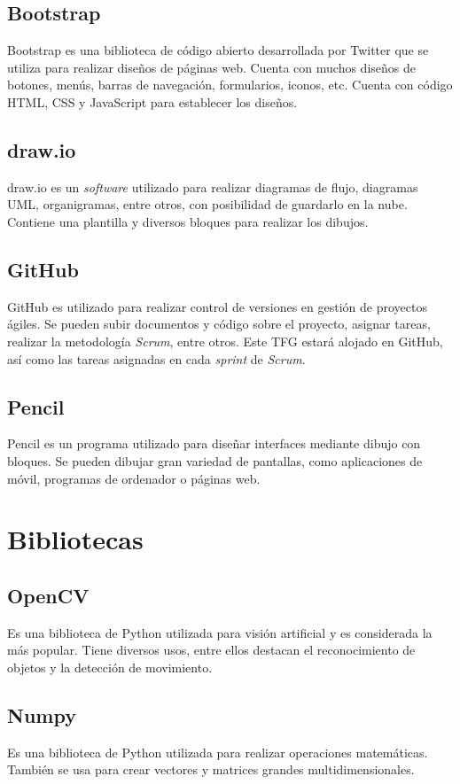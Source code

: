 \subsection{Bootstrap}
Bootstrap es una biblioteca de código abierto desarrollada por Twitter que se utiliza para realizar diseños de páginas web. Cuenta con muchos diseños de botones, menús, barras de navegación, formularios, iconos, etc. Cuenta con código HTML, CSS y JavaScript para establecer los diseños.

\subsection{draw.io}
draw.io es un \textit{software} utilizado para realizar diagramas de flujo, diagramas UML, organigramas, entre otros, con posibilidad de guardarlo en la nube. Contiene una plantilla y diversos bloques para realizar los dibujos.

\subsection{GitHub}
GitHub es utilizado para realizar control de versiones en gestión de proyectos ágiles. Se pueden subir documentos y código sobre el proyecto, asignar tareas, realizar la metodología \textit{Scrum}, entre otros. Este TFG estará alojado en GitHub, así como las tareas asignadas en cada \textit{sprint} de \textit{Scrum}.

\subsection{Pencil}
Pencil es un programa utilizado para diseñar interfaces mediante dibujo con bloques. Se pueden dibujar gran variedad de pantallas, como aplicaciones de móvil, programas de ordenador o páginas web.

\section{Bibliotecas}
\subsection{OpenCV}
Es una biblioteca de Python utilizada para visión artificial y es considerada la más popular. Tiene diversos usos, entre ellos destacan el reconocimiento de objetos y la detección de movimiento.~\cite{wiki:opencv}

\subsection{Numpy}
Es una biblioteca de Python utilizada para realizar operaciones matemáticas. También se usa para crear vectores y matrices grandes multidimensionales.~\cite{wiki:numpy}

